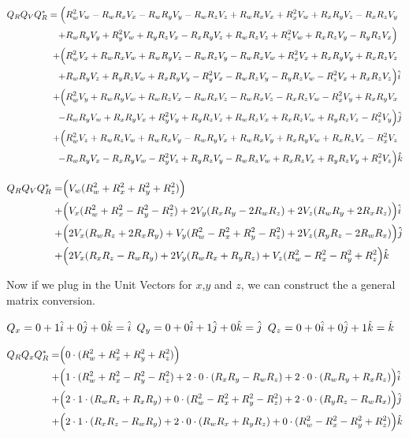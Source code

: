 \begin{align*}
Q_RQ_VQ_R^* = \Big(
	 & R_w^2V_w - R_wR_xV_x - R_wR_yV_y - R_wR_zV_z
	+  R_wR_xV_x + R_x^2V_w + R_xR_yV_z - R_xR_zV_y\\
	+& R_wR_yV_y + R_y^2V_w + R_yR_zV_x - R_xR_yV_z
	+  R_wR_zV_z + R_z^2V_w + R_xR_zV_y - R_yR_zV_x
	\Big)\\+\Big(
	 & R_w^2V_x + R_wR_xV_w + R_wR_yV_z - R_wR_zV_y
	-  R_wR_xV_w + R_x^2V_x + R_xR_yV_y + R_xR_zV_z\\
	+& R_wR_yV_z + R_yR_zV_w + R_xR_yV_y - R_y^2V_x
	-  R_wR_zV_y - R_yR_zV_w - R_z^2V_x + R_xR_zV_z
	\Big)\hat{\textcolor{black}{i}}\\+\Big(
	 & R_w^2V_y + R_wR_yV_w + R_wR_zV_x - R_wR_xV_z
	-  R_wR_xV_z - R_xR_zV_w - R_x^2V_y + R_xR_yV_x\\
	-& R_wR_yV_w + R_xR_yV_x + R_y^2V_y + R_yR_zV_z
	+  R_wR_zV_x + R_xR_zV_w + R_yR_zV_z - R_z^2V_y
	\Big)\hat{\textcolor{black}{j}}\\+\Big(
	 & R_w^2V_z + R_wR_zV_w + R_wR_xV_y - R_wR_yV_x
	+  R_wR_xV_y + R_xR_yV_w + R_xR_zV_x - R_x^2V_z\\
	-& R_wR_yV_x - R_xR_yV_w - R_y^2V_z + R_yR_zV_y
	-  R_wR_zV_w + R_xR_zV_x + R_yR_zV_y + R_z^2V_z\Big)\hat{\textcolor{black}{k}}
\end{align*}

\begin{align*}
Q_RQ_VQ_R^* =
	&\Big(
	 V_w(R_w^2 + R_x^2 + R_y^2 + R_z^2)
	\Big)\\
	  +&\Big(
	   V_x(R_w^2 + R_x^2 - R_y^2 - R_z^2)
	  + 2V_y(R_xR_y - 2R_wR_z)
	  + 2V_z(R_wR_y + 2R_xR_z)
	\Big)\hat{\textcolor{black}{i}}\\
	+&\Big(
	    2V_x(R_wR_z + 2R_xR_y)
	  +  V_y(R_w^2 - R_x^2 + R_y^2 - R_z^2)
	  + 2V_z(R_yR_z - 2R_wR_x)
	\Big)\hat{\textcolor{black}{j}}\\
	+&\Big(
	    2V_x(R_xR_z - R_wR_y)
	  + 2V_y(R_wR_x + R_yR_z)
	  +  V_z(R_w^2 - R_x^2 - R_y^2 + R_z^2
	\Big)\hat{\textcolor{black}{k}}
\end{align*}

Now if we plug in the Unit Vectors for $x$,$y$ and $z$, we can construct the a general matrix conversion.
\begin{multicols}{3}
$Q_x=0+1\hat{\textcolor{black}{i}}+0\hat{\textcolor{black}{j}}+0\hat{\textcolor{black}{k}}=\hat{\textcolor{black}{i}}$
\columnbreak
$Q_y=0+0\hat{\textcolor{black}{i}}+1\hat{\textcolor{black}{j}}+0\hat{\textcolor{black}{k}}=\hat{\textcolor{black}{j}}$
\columnbreak
$Q_z=0+0\hat{\textcolor{black}{i}}+0\hat{\textcolor{black}{j}}+1\hat{\textcolor{black}{k}}=\hat{\textcolor{black}{k}}$
\columnbreak
\end{multicols}

\begin{align*}
Q_RQ_xQ_R^* =
	&\Big(
	 0 \cdot (R_w^2 + R_x^2 + R_y^2 + R_z^2)
	\Big)\\
	+&\Big(
	           1 \cdot (R_w^2 + R_x^2 - R_y^2 - R_z^2)
	 + 2 \cdot 0 \cdot (R_xR_y - R_wR_z)
	 + 2 \cdot 0 \cdot (R_wR_y + R_xR_z)
	\Big)\hat{\textcolor{black}{i}}\\
	+&\Big(
	   2 \cdot 1 \cdot (R_wR_z + R_xR_y)
	 +         0 \cdot (R_w^2 - R_x^2 + R_y^2 - R_z^2)
	 + 2 \cdot 0 \cdot (R_yR_z - R_wR_x)
	\Big)\hat{\textcolor{black}{j}}\\
	+&\Big(
	   2 \cdot 1 \cdot (R_xR_z - R_wR_y)
	 + 2 \cdot 0 \cdot (R_wR_x + R_yR_z)
	 +         0 \cdot (R_w^2 - R_x^2 - R_y^2 + R_z^2)
	\Big)\hat{\textcolor{black}{k}}
\end{align*}

